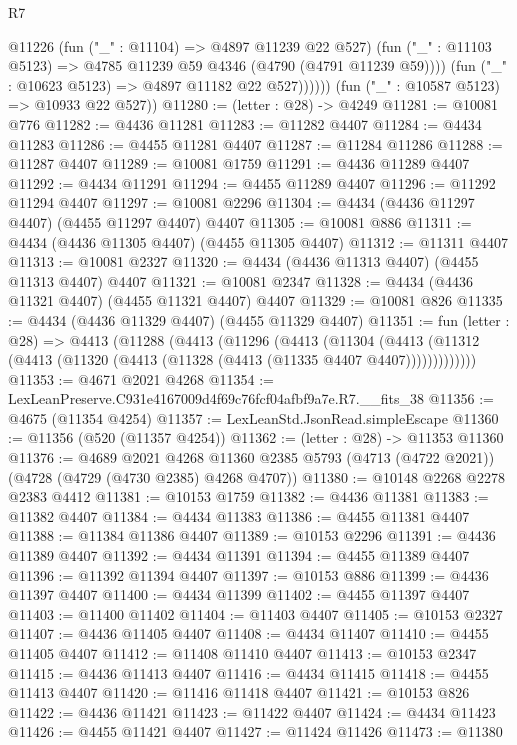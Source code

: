 \begin{lexlean}{R7}
\begin{coremodule}
                @11226
                  (fun ("_" : @11104) => @4897 @11239 @22 @527)
                  (fun ("_" : @11103 @5123) => @4785 @11239 @59 @4346 (@4790 (@4791 @11239 @59))))
                (fun ("_" : @10623 @5123) => @4897 @11182 @22 @527))))))
      (fun ("_" : @10587 @5123) => @10933 @22 @527))
@11280 := (letter : @28) -> @4249
@11281 := @10081 @776
@11282 := @4436 @11281
@11283 := @11282 @4407
@11284 := @4434 @11283
@11286 := @4455 @11281 @4407
@11287 := @11284 @11286
@11288 := @11287 @4407
@11289 := @10081 @1759
@11291 := @4436 @11289 @4407
@11292 := @4434 @11291
@11294 := @4455 @11289 @4407
@11296 := @11292 @11294 @4407
@11297 := @10081 @2296
@11304 := @4434 (@4436 @11297 @4407) (@4455 @11297 @4407) @4407
@11305 := @10081 @886
@11311 := @4434 (@4436 @11305 @4407) (@4455 @11305 @4407)
@11312 := @11311 @4407
@11313 := @10081 @2327
@11320 := @4434 (@4436 @11313 @4407) (@4455 @11313 @4407) @4407
@11321 := @10081 @2347
@11328 := @4434 (@4436 @11321 @4407) (@4455 @11321 @4407) @4407
@11329 := @10081 @826
@11335 := @4434 (@4436 @11329 @4407) (@4455 @11329 @4407)
@11351 := fun (letter : @28) =>
  @4413
    (@11288
      (@4413
        (@11296
          (@4413
            (@11304
              (@4413 (@11312 (@4413 (@11320 (@4413 (@11328 (@4413 (@11335 @4407 @4407)))))))))))))
@11353 := @4671 @2021 @4268
@11354 := LexLeanPreserve.C931e4167009d4f69c76fcf04afbf9a7e.R7.__fits_38
@11356 := @4675 (@11354 @4254)
@11357 := LexLeanStd.JsonRead.simpleEscape
@11360 := @11356 (@520 (@11357 @4254))
@11362 := (letter : @28) -> @11353 @11360
@11376 := @4689
    @2021
    @4268
    @11360
    @2385
    @5793
    (@4713 (@4722 @2021))
    (@4728 (@4729 (@4730 @2385) @4268 @4707))
@11380 := @10148 @2268 @2278 @2383 @4412
@11381 := @10153 @1759
@11382 := @4436 @11381
@11383 := @11382 @4407
@11384 := @4434 @11383
@11386 := @4455 @11381 @4407
@11388 := @11384 @11386 @4407
@11389 := @10153 @2296
@11391 := @4436 @11389 @4407
@11392 := @4434 @11391
@11394 := @4455 @11389 @4407
@11396 := @11392 @11394 @4407
@11397 := @10153 @886
@11399 := @4436 @11397 @4407
@11400 := @4434 @11399
@11402 := @4455 @11397 @4407
@11403 := @11400 @11402
@11404 := @11403 @4407
@11405 := @10153 @2327
@11407 := @4436 @11405 @4407
@11408 := @4434 @11407
@11410 := @4455 @11405 @4407
@11412 := @11408 @11410 @4407
@11413 := @10153 @2347
@11415 := @4436 @11413 @4407
@11416 := @4434 @11415
@11418 := @4455 @11413 @4407
@11420 := @11416 @11418 @4407
@11421 := @10153 @826
@11422 := @4436 @11421
@11423 := @11422 @4407
@11424 := @4434 @11423
@11426 := @4455 @11421 @4407
@11427 := @11424 @11426
@11473 := @11380

\end{coremodule}
\end{lexlean}
